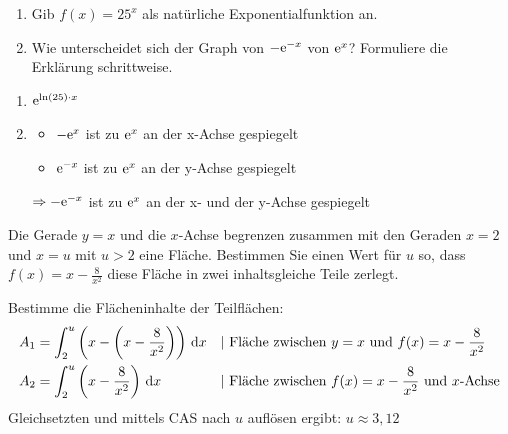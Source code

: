 \begin{enumerate}
	\item Gib $f(x)=25^x$ als natürliche Exponentialfunktion an.
	\item	Wie unterscheidet sich der Graph von $-\mathrm{e}^{-x}$ von $\mathrm{e}^x$? Formuliere die Erklärung schrittweise.
\end{enumerate}
\begin{lsg}{}
	\begin{enumerate}
		\item $\mathrm{e}^{\ln(25)\cdot x}$
		\item 	\begin{itemize}
					\item $-\mathrm{e}^x$ ist zu $ \mathrm{e}^x$ an der x-Achse gespiegelt
					\item $\mathrm{e}^{-x}$ ist zu $\mathrm{e}^x$ an der y-Achse gespiegelt
				\end{itemize}
				$\Rightarrow -\mathrm{e}^{-x}$ ist zu $\mathrm{e}^x$ an der x- und der y-Achse gespiegelt
	\end{enumerate}
\end{lsg}


Die Gerade $y=x$ und die $x$-Achse begrenzen zusammen mit den Geraden $x=2$ und $x=u$ mit $u>2$ eine Fläche. Bestimmen Sie einen Wert für $u$ so, dass $f(x)=x-\frac{8}{x^2}$ diese Fläche in zwei inhaltsgleiche Teile zerlegt. \cas
\begin{lsg}{}
  Bestimme die Flächeninhalte der Teilflächen:\begin{align*}
  A_1&=\int_2^u\left(x-\left(x-\frac{8}{x^2}\right)\right)\d x&&|\ \text{Fläche zwischen $y=x$ und $f(x)=x-\frac{8}{x^2}$}\\
  A_2&= \int_2^u\left(x-\frac{8}{x^2}\right)\d x&&|\ \text{Fläche zwischen $f(x)=x-\frac{8}{x^2}$ und $x$-Achse}
  \end{align*}
  Gleichsetzten und mittels CAS nach $u$ auflösen ergibt: $u\approx 3,12$
\end{lsg}



